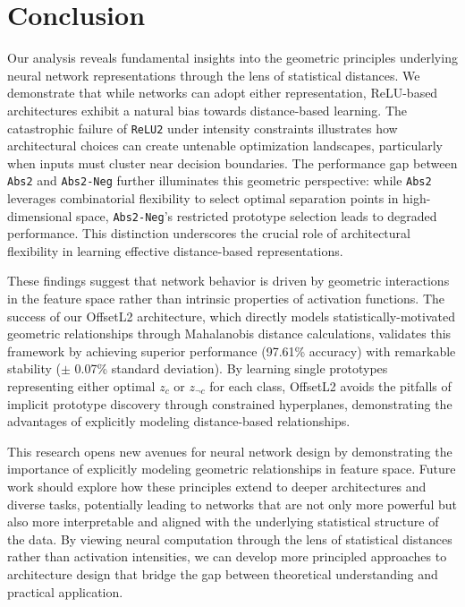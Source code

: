 \section{Conclusion}
\label{sec:conclusion}

Our analysis reveals fundamental insights into the geometric principles underlying neural network representations through the lens of statistical distances. We demonstrate that while networks can adopt either representation, ReLU-based architectures exhibit a natural bias towards distance-based learning. The catastrophic failure of \texttt{ReLU2} under intensity constraints illustrates how architectural choices can create untenable optimization landscapes, particularly when inputs must cluster near decision boundaries. The performance gap between \texttt{Abs2} and \texttt{Abs2-Neg} further illuminates this geometric perspective: while \texttt{Abs2} leverages combinatorial flexibility to select optimal separation points in high-dimensional space, \texttt{Abs2-Neg}'s restricted prototype selection leads to degraded performance. This distinction underscores the crucial role of architectural flexibility in learning effective distance-based representations.

These findings suggest that network behavior is driven by geometric interactions in the feature space rather than intrinsic properties of activation functions. The success of our OffsetL2 architecture, which directly models statistically-motivated geometric relationships through Mahalanobis distance calculations, validates this framework by achieving superior performance (97.61\% accuracy) with remarkable stability ($\pm$ 0.07\% standard deviation). By learning single prototypes representing either optimal $z_c$ or $z_{\neg c}$ for each class, OffsetL2 avoids the pitfalls of implicit prototype discovery through constrained hyperplanes, demonstrating the advantages of explicitly modeling distance-based relationships.

This research opens new avenues for neural network design by demonstrating the importance of explicitly modeling geometric relationships in feature space. Future work should explore how these principles extend to deeper architectures and diverse tasks, potentially leading to networks that are not only more powerful but also more interpretable and aligned with the underlying statistical structure of the data. By viewing neural computation through the lens of statistical distances rather than activation intensities, we can develop more principled approaches to architecture design that bridge the gap between theoretical understanding and practical application.

